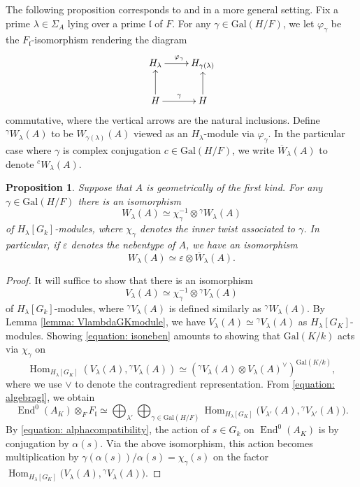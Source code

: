 \documentclass[oneside]{amsart}
\newtheorem{proposition}[theorem]{Proposition}
\theoremstyle{remark}
\newcommand{\Gal}{\mathrm{Gal}}
\newcommand{\End}{\operatorname{End}}
\newcommand{\Hom}{\operatorname{Hom}}
\newcommand{\gl}{\mathfrak{l}}
\numberwithin{equation}{section}
\begin{document}
The following proposition corresponds to \cite[Lemma~5.10]{Pyl04} and \cite[Thm. 5.5]{Chi87} in a more general setting. Fix a prime $\lambda \in \Sigma_A$ lying over a prime  $\gl$ of $F$. For any $\gamma\in \Gal(H/F)$, we let $\varphi_\gamma$ be the $F_\gl$-isomorphism rendering the diagram
\begin{align*}
  \xymatrix{
H_{\lambda}  \ar[r]^{\varphi_\gamma} & H_{\gamma(\lambda)}\\
H \ar[r]^{\gamma}\ar[u]^{} & H  \ar[u]}
\end{align*}
commutative, where the vertical arrows are the natural inclusions. Define ${}^\gamma W_\lambda(A)$ to be $ W_{\gamma(\lambda)}(A)$ viewed as an $H_\lambda$-module via $\varphi_\gamma$. In the particular case where $\gamma$ is complex conjugation $c\in\Gal(H/F)$, we write $\overline{W}_\lambda(A)$ to denote ${}^cW_\lambda(A)$. 
\begin{proposition}\label{proposition: innertwistsWlambda}
Suppose that $A$ is geometrically of the first kind. For any $\gamma\in\Gal(H/F)$ there is an isomorphism 
$$
W_{\lambda}(A) \simeq \chi_\gamma^{-1} \otimes {}^\gamma W_{\lambda}(A)
$$
of $H_\lambda[G_k]$-modules, where $\chi_\gamma$ denotes the inner twist associated to $\gamma$. In particular, if $\varepsilon $ denotes the nebentype of $A$, we have an isomorphism 
$$
W_{\lambda}(A) \simeq \varepsilon \otimes \overline{W}_{\lambda}(A). 
$$
\end{proposition}

\begin{proof}
It will suffice to show that there is an isomorphism 
\begin{equation}\label{equation: isoneben}
V_{\lambda}(A) \simeq \chi_\gamma^{-1} \otimes {}^\gamma V_{\lambda}(A)
\end{equation}
of $H_\lambda[G_k]$-modules, where ${}^\gamma V_{\lambda}(A)$ is defined similarly as ${}^\gamma W_{\lambda}(A)$. By Lemma \ref{lemma: VlambdaGKmodule}, we have $V_\lambda(A) \simeq {}^\gamma V_{\lambda}(A)$ as $H_\lambda[G_K]$-modules. Showing \eqref{equation: isoneben} amounts to showing that $\Gal(K/k)$ acts via $\chi_\gamma$ on 
$$
\Hom_{H_\lambda[G_K]}(V_\lambda(A),{}^\gamma V_{\lambda}(A))\simeq ({}^\gamma V_{\lambda}(A)\otimes V_{\lambda}(A)^\vee)^{\Gal(K/k)},
$$
where we use $\vee$ to denote the contragredient representation. From \eqref{equation: algebragl}, we obtain
$$
\End^0(A_K)\otimes_F F_\gl \simeq  \bigoplus_{\lambda' }\bigoplus_{\gamma\in\Gal(H/F)}\Hom_{H_\lambda[G_K]} \big( V_{\lambda'}(A), {}^\gamma V_{\lambda'}(A) \big).
$$ 
By \eqref{equation: alphacompatibility}, the action of $s \in G_k$ on $\End^0(A_K)$ is by conjugation by $\alpha(s)$. Via the above isomorphism, this action becomes multiplication by $\gamma(\alpha(s))/\alpha(s)=\chi_\gamma(s)$ on the factor $\Hom_{H_\lambda[G_K]} \big( V_{\lambda}(A), {}^\gamma V_{\lambda}(A) \big)$.
\end{proof}
\end{document}
